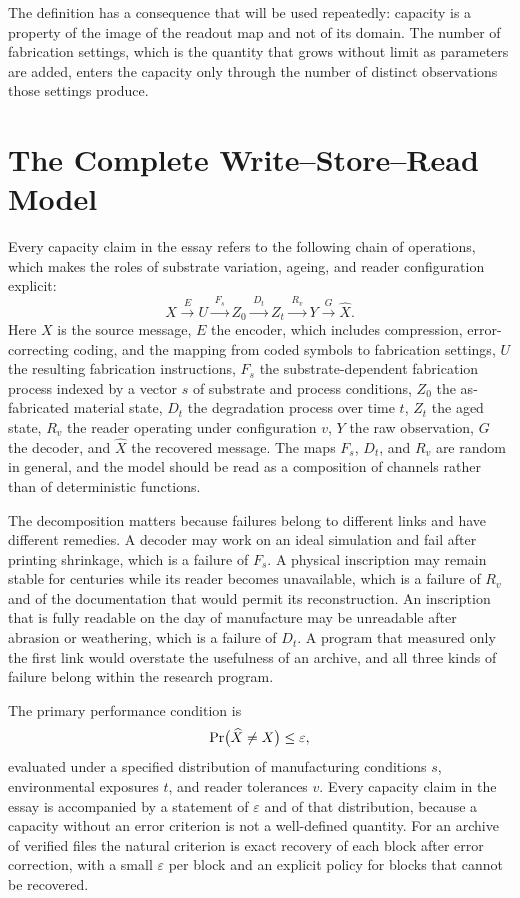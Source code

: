The definition has a consequence that will be used repeatedly: capacity is a property of the image of the readout map and not of its domain. The number of fabrication settings, which is the quantity that grows without limit as parameters are added, enters the capacity only through the number of distinct observations those settings produce.

\section{The Complete Write--Store--Read Model}\label{sec:model}

Every capacity claim in the essay refers to the following chain of operations, which makes the roles of substrate variation, ageing, and reader configuration explicit:
\[
X\xrightarrow{\;E\;}U\xrightarrow{\;F_s\;}Z_0\xrightarrow{\;D_t\;}Z_t\xrightarrow{\;R_v\;}Y\xrightarrow{\;G\;}\widehat X .
\]
Here $X$ is the source message, $E$ the encoder, which includes compression, error-correcting coding, and the mapping from coded symbols to fabrication settings, $U$ the resulting fabrication instructions, $F_s$ the substrate-dependent fabrication process indexed by a vector $s$ of substrate and process conditions, $Z_0$ the as-fabricated material state, $D_t$ the degradation process over time $t$, $Z_t$ the aged state, $R_v$ the reader operating under configuration $v$, $Y$ the raw observation, $G$ the decoder, and $\widehat X$ the recovered message. The maps $F_s$, $D_t$, and $R_v$ are random in general, and the model should be read as a composition of channels rather than of deterministic functions.

The decomposition matters because failures belong to different links and have different remedies. A decoder may work on an ideal simulation and fail after printing shrinkage, which is a failure of $F_s$. A physical inscription may remain stable for centuries while its reader becomes unavailable, which is a failure of $R_v$ and of the documentation that would permit its reconstruction. An inscription that is fully readable on the day of manufacture may be unreadable after abrasion or weathering, which is a failure of $D_t$. A program that measured only the first link would overstate the usefulness of an archive, and all three kinds of failure belong within the research program.

The primary performance condition is
\begin{equation}\label{eq:perr}
\operatorname{Pr}\bigl(\widehat X\neq X\bigr)\le\varepsilon,
\end{equation}
evaluated under a specified distribution of manufacturing conditions $s$, environmental exposures $t$, and reader tolerances $v$. Every capacity claim in the essay is accompanied by a statement of $\varepsilon$ and of that distribution, because a capacity without an error criterion is not a well-defined quantity. For an archive of verified files the natural criterion is exact recovery of each block after error correction, with a small $\varepsilon$ per block and an explicit policy for blocks that cannot be recovered.

